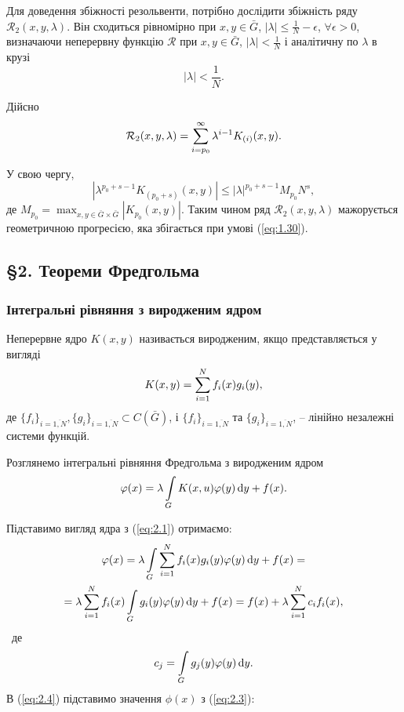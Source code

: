Для доведення збіжності резольвенти, потрібно дослідити збіжність ряду $\mathcal{R}_2(x, y, \lambda)$. Він сходиться рівномірно при $x, y \in \bar G$, $|\lambda| \le \frac{1}{N} - \epsilon$, $\forall \epsilon > 0$, визначаючи неперервну функцію $\mathcal{R}$ при $x, y \in \bar G$, $|\lambda| < \frac{1}{N}$ і аналітичну по $\lambda$ в крузі 
\begin{equation}
	\label{eq:1.30}
	|\lambda| < \dfrac{1}{N}.
\end{equation}

Дійсно \[\mathcal{R}_2(x, y, \lambda) = \displaystyle\sum\limits_{i = p_0}^\infty \lambda^{i - 1} K_{(i)}(x, y).\]

У свою чергу, \[|\lambda^{p_0 + s - 1} K_{(p_0 + s)}(x, y)| \le |\lambda|^{p_0 + s - 1} M_{p_0} N^s,\] де $M_{p_0} = \max_{x, y \in \bar G \times \bar G} |K_{p_0}(x, y)|$. Таким чином ряд $\mathcal{R}_2(x, y, \lambda)$ мажорується геометричною прогресією, яка збігається при умові (\ref{eq:1.30}).

\subsection*{\S2. Теореми Фредгольма}
\subsubsection*{Інтегральні рівняння з виродженим ядром}

\begin{definition*}
	Неперервне ядро $K(x, y)$ називається виродженим, якщо представляється у вигляді
	\begin{equation}
		\label{eq:2.1}
		K(x, y) = \displaystyle\sum\limits_{i = 1}^N f_i(x) g_i(y),
	\end{equation}
	де $\{ f_i \}_{i = \overline{1, N}}, \{ g_i \}_{i = \overline{1, N}} \subset C(\bar G)$, і $\{ f_i \}_{i = \overline{1, N}}$ та $\{ g_i \}_{i = \overline{1, N}}$, -- лінійно незалежні системи функцій.
\end{definition*}

Розглянемо інтегральні рівняння Фредгольма з виродженим ядром 
\begin{equation}
	\label{eq:2.2}
	\varphi(x) = \lambda \displaystyle\int\limits_G K(x, u) \varphi(y) \mathop{}\!\mathrm{d} y + f(x).
\end{equation}

Підставимо вигляд ядра з (\ref{eq:2.1}) отримаємо:
\begin{multline}
	\label{eq:2.3}
	\varphi(x) = \lambda \displaystyle\int\limits_G \displaystyle\sum\limits_{i = 1}^N f_i(x) g_i(y) \varphi(y) \mathop{}\!\mathrm{d} y + f(x) = \\
	= \lambda \displaystyle\sum\limits_{i = 1}^N f_i(x) \displaystyle\int\limits_G g_i(y) \varphi(y) \mathop{}\!\mathrm{d} y + f(x) = f(x) + \lambda \displaystyle\sum\limits_{i = 1}^N c_i f_i(x),
\end{multline}\
де 
\begin{equation}
	\label{eq:2.4}
	c_j = \displaystyle\int\limits_G g_j(y) \varphi(y) \mathop{}\!\mathrm{d} y.
\end{equation}
В (\ref{eq:2.4}) підставимо значення $\phi(x)$ з (\ref{eq:2.3}):

